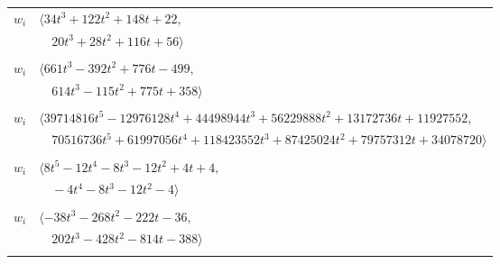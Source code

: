 \documentclass[11pt]{article}
\begin{document}
\begin{longtable}{@{}ll@{}}
$w_i$ & $\langle 34t^{3}+122t^{2}+148t+22,$\\
 & $\quad 20t^{3}+28t^{2}+116t+56\rangle$\\
\addlinespace[2pt]
\multicolumn{2}{@{}p{0.97\textwidth}@{}}{$i=41$, $D_i=32$, $\rho_{ij}$: $1{:}1, \allowbreak 4{:}1, \allowbreak 10{:}2, \allowbreak 23{:}1, \allowbreak 28{:}2, \allowbreak 30{:}2, \allowbreak 34{:}1, \allowbreak 37{:}2, \allowbreak 39{:}1, \allowbreak 43{:}2, \allowbreak 47{:}2$}\\
$w_i$ & $\langle 661t^{3}-392t^{2}+776t-499,$\\
 & $\quad 614t^{3}-115t^{2}+775t+358\rangle$\\
\addlinespace[2pt]
\multicolumn{2}{@{}p{0.97\textwidth}@{}}{$i=42$, $D_i=65536$, $\rho_{ij}$: $1{:}2, \allowbreak 2{:}2, \allowbreak 4{:}2, \allowbreak 13{:}2, \allowbreak 18{:}2, \allowbreak 19{:}2, \allowbreak 24{:}2, \allowbreak 29{:}2, \allowbreak 31{:}2, \allowbreak 33{:}1, \allowbreak 34{:}1, \allowbreak 39{:}1, \allowbreak 43{:}2, \allowbreak 44{:}2$}\\
$w_i$ & $\langle 39714816t^{5}-12976128t^{4}+44498944t^{3}+56229888t^{2}+13172736t+11927552,$\\
 & $\quad 70516736t^{5}+61997056t^{4}+118423552t^{3}+87425024t^{2}+79757312t+34078720\rangle$\\
\addlinespace[2pt]
\multicolumn{2}{@{}p{0.97\textwidth}@{}}{$i=43$, $D_i=4$, $\rho_{ij}$: $11{:}1, \allowbreak 15{:}2, \allowbreak 17{:}1, \allowbreak 21{:}2, \allowbreak 23{:}1, \allowbreak 26{:}1, \allowbreak 38{:}2, \allowbreak 41{:}1, \allowbreak 42{:}1, \allowbreak 46{:}1$}\\
$w_i$ & $\langle 8t^{5}-12t^{4}-8t^{3}-12t^{2}+4t+4,$\\
 & $\quad -4t^{4}-8t^{3}-12t^{2}-4\rangle$\\
\addlinespace[2pt]
\multicolumn{2}{@{}p{0.97\textwidth}@{}}{$i=44$, $D_i=32$, $\rho_{ij}$: $9{:}2, \allowbreak 13{:}2, \allowbreak 22{:}2, \allowbreak 24{:}2, \allowbreak 29{:}2, \allowbreak 30{:}2, \allowbreak 36{:}1, \allowbreak 38{:}2, \allowbreak 42{:}1$}\\
$w_i$ & $\langle -38t^{3}-268t^{2}-222t-36,$\\
 & $\quad 202t^{3}-428t^{2}-814t-388\rangle$\\
\addlinespace[2pt]
\multicolumn{2}{@{}p{0.97\textwidth}@{}}{$i=45$, $D_i=8$, $\rho_{ij}$: $4{:}2, \allowbreak 7{:}2, \allowbreak 10{:}2, \allowbreak 14{:}1, \allowbreak 15{:}2, \allowbreak 17{:}2, \allowbreak 28{:}1, \allowbreak 30{:}2, \allowbreak 40{:}1$}\\

\end{longtable}
\end{document}
